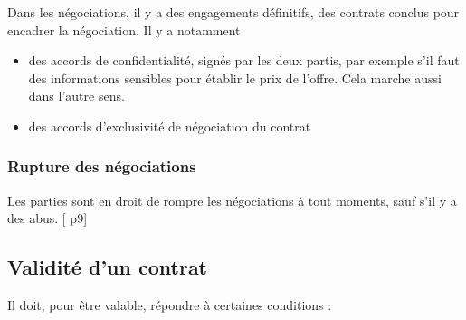 				Dans les négociations, il y a des engagements définitifs, des contrats conclus pour encadrer la négociation. Il y a notamment 
		
			\begin{itemize}
				\item des accords de confidentialité, signés par les deux partis, par exemple s'il faut des informations sensibles pour établir le prix de l'offre. Cela marche aussi dans l'autre sens.
				\item des accords d'exclusivité de négociation du contrat
			\end{itemize}
		
			\subsubsection{Rupture des négociations}
		
			Les parties sont en droit de rompre les négociations à tout moments, sauf s'il y a des abus. [ p9]
		
		\subsection{Validité d'un contrat}
		
		Il doit, pour être valable, répondre à certaines conditions :
		
